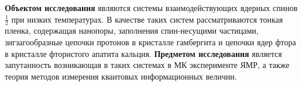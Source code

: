 \textbf{Объектом исследования} являются системы взаимодействующих ядерных спинов $\frac{1}{2}$ при низких температурах. 
В качестве таких систем рассматриваются тонкая пленка, содержащая нанопоры, заполнения спин-несущими частицами\cite{Baugh2001}, 
зигзагообразные цепочки протонов в кристалле гамбергита\cite{Bochkin2020jmr} 
и цепочки ядер фтора в кристалле фтористого апатита кальция\cite{Bochkin2019jmr}.   
\textbf{Предметом исследования} является запутанность возникающая в таких системах в МК эксперименте ЯМР, 
а также теория методов измерения квантовых информационных величин. 